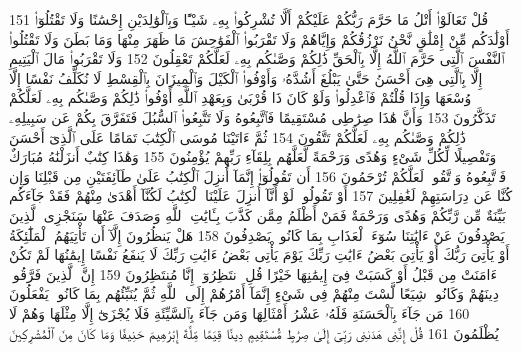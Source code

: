 {\tiny\colorbox{cl_aya}{151}} قُلْ تَعَالَوْا۟ أَتْلُ مَا حَرَّمَ رَبُّكُمْ عَلَيْكُمْ أَلَّا تُشْرِكُوا۟ بِهِۦ شَيْـًٔا وَبِٱلْوَٰلِدَيْنِ إِحْسَٰنًا وَلَا تَقْتُلُوٓا۟ أَوْلَٰدَكُم مِّنْ إِمْلَٰقٍ نَّحْنُ نَرْزُقُكُمْ وَإِيَّاهُمْ وَلَا تَقْرَبُوا۟ ٱلْفَوَٰحِشَ مَا ظَهَرَ مِنْهَا وَمَا بَطَنَ وَلَا تَقْتُلُوا۟ ٱلنَّفْسَ ٱلَّتِى حَرَّمَ ٱللَّهُ إِلَّا بِٱلْحَقِّ ذَٰلِكُمْ وَصَّىٰكُم بِهِۦ لَعَلَّكُمْ تَعْقِلُونَ
{\tiny\colorbox{cl_aya}{152}} وَلَا تَقْرَبُوا۟ مَالَ ٱلْيَتِيمِ إِلَّا بِٱلَّتِى هِىَ أَحْسَنُ حَتَّىٰ يَبْلُغَ أَشُدَّهُۥ وَأَوْفُوا۟ ٱلْكَيْلَ وَٱلْمِيزَانَ بِٱلْقِسْطِ لَا نُكَلِّفُ نَفْسًا إِلَّا وُسْعَهَا وَإِذَا قُلْتُمْ فَٱعْدِلُوا۟ وَلَوْ كَانَ ذَا قُرْبَىٰ وَبِعَهْدِ ٱللَّهِ أَوْفُوا۟ ذَٰلِكُمْ وَصَّىٰكُم بِهِۦ لَعَلَّكُمْ تَذَكَّرُونَ
{\tiny\colorbox{cl_aya}{153}} وَأَنَّ هَٰذَا صِرَٰطِى مُسْتَقِيمًا فَٱتَّبِعُوهُ وَلَا تَتَّبِعُوا۟ ٱلسُّبُلَ فَتَفَرَّقَ بِكُمْ عَن سَبِيلِهِۦ ذَٰلِكُمْ وَصَّىٰكُم بِهِۦ لَعَلَّكُمْ تَتَّقُونَ
{\tiny\colorbox{cl_aya}{154}} ثُمَّ ءَاتَيْنَا مُوسَى ٱلْكِتَٰبَ تَمَامًا عَلَى ٱلَّذِىٓ أَحْسَنَ وَتَفْصِيلًا لِّكُلِّ شَىْءٍ وَهُدًى وَرَحْمَةً لَّعَلَّهُم بِلِقَآءِ رَبِّهِمْ يُؤْمِنُونَ
{\tiny\colorbox{cl_aya}{155}} وَهَٰذَا كِتَٰبٌ أَنزَلْنَٰهُ مُبَارَكٌ فَٱتَّبِعُوهُ وَٱتَّقُوا۟ لَعَلَّكُمْ تُرْحَمُونَ
{\tiny\colorbox{cl_aya}{156}} أَن تَقُولُوٓا۟ إِنَّمَآ أُنزِلَ ٱلْكِتَٰبُ عَلَىٰ طَآئِفَتَيْنِ مِن قَبْلِنَا وَإِن كُنَّا عَن دِرَاسَتِهِمْ لَغَٰفِلِينَ
{\tiny\colorbox{cl_aya}{157}} أَوْ تَقُولُوا۟ لَوْ أَنَّآ أُنزِلَ عَلَيْنَا ٱلْكِتَٰبُ لَكُنَّآ أَهْدَىٰ مِنْهُمْ فَقَدْ جَآءَكُم بَيِّنَةٌ مِّن رَّبِّكُمْ وَهُدًى وَرَحْمَةٌ فَمَنْ أَظْلَمُ مِمَّن كَذَّبَ بِـَٔايَٰتِ ٱللَّهِ وَصَدَفَ عَنْهَا سَنَجْزِى ٱلَّذِينَ يَصْدِفُونَ عَنْ ءَايَٰتِنَا سُوٓءَ ٱلْعَذَابِ بِمَا كَانُوا۟ يَصْدِفُونَ
{\tiny\colorbox{cl_aya}{158}} هَلْ يَنظُرُونَ إِلَّآ أَن تَأْتِيَهُمُ ٱلْمَلَٰٓئِكَةُ أَوْ يَأْتِىَ رَبُّكَ أَوْ يَأْتِىَ بَعْضُ ءَايَٰتِ رَبِّكَ يَوْمَ يَأْتِى بَعْضُ ءَايَٰتِ رَبِّكَ لَا يَنفَعُ نَفْسًا إِيمَٰنُهَا لَمْ تَكُنْ ءَامَنَتْ مِن قَبْلُ أَوْ كَسَبَتْ فِىٓ إِيمَٰنِهَا خَيْرًا قُلِ ٱنتَظِرُوٓا۟ إِنَّا مُنتَظِرُونَ
{\tiny\colorbox{cl_aya}{159}} إِنَّ ٱلَّذِينَ فَرَّقُوا۟ دِينَهُمْ وَكَانُوا۟ شِيَعًا لَّسْتَ مِنْهُمْ فِى شَىْءٍ إِنَّمَآ أَمْرُهُمْ إِلَى ٱللَّهِ ثُمَّ يُنَبِّئُهُم بِمَا كَانُوا۟ يَفْعَلُونَ
{\tiny\colorbox{cl_aya}{160}} مَن جَآءَ بِٱلْحَسَنَةِ فَلَهُۥ عَشْرُ أَمْثَالِهَا وَمَن جَآءَ بِٱلسَّيِّئَةِ فَلَا يُجْزَىٰٓ إِلَّا مِثْلَهَا وَهُمْ لَا يُظْلَمُونَ
{\tiny\colorbox{cl_aya}{161}} قُلْ إِنَّنِى هَدَىٰنِى رَبِّىٓ إِلَىٰ صِرَٰطٍ مُّسْتَقِيمٍ دِينًا قِيَمًا مِّلَّةَ إِبْرَٰهِيمَ حَنِيفًا وَمَا كَانَ مِنَ ٱلْمُشْرِكِينَ
